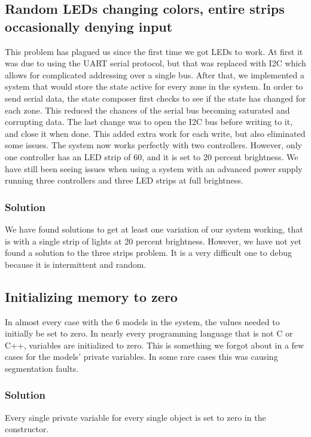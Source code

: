 \documentclass[onecolumn, draftclsnofoot,10pt, compsoc]{IEEEtran}
\begin{document}
		\subsection{Random LEDs changing colors, entire strips occasionally denying input}
			This problem has plagued us since the first time we got LEDs to work.
			At first it was due to using the UART serial protocol, but that was replaced with I2C which allows for complicated addressing over a single bus.
			After that, we implemented a system that would store the state active for every zone in the system.
			In order to send serial data, the state composer first checks to see if the state has changed for each zone.
			This reduced the chances of the serial bus becoming saturated and corrupting data.
			The last change was to open the I2C bus before writing to it, and close it when done. This added extra work for each write, but also eliminated some issues.
			The system now works perfectly with two controllers. However, only one controller has an LED strip of 60, and it is set to 20 percent brightness.
			We have still been seeing issues when using a system with an advanced power supply running three controllers and three LED strips at full brightness.
			
			\subsubsection{Solution}
				We have found solutions to get at least one variation of our system working, that is with a single strip of lights at 20 percent brightness.
				However, we have not yet found a solution to the three strips problem. It is a very difficult one to debug because it is intermittent and random.
		
		\subsection{Initializing memory to zero}
			In almost every case with the 6 models in the system, the values needed to initially be set to zero.
			In nearly every programming language that is not C or C++, variables are initialized to zero.
			This is something we forgot about in a few cases for the models' private variables.
			In some rare cases this was causing segmentation faults.
			
			\subsubsection{Solution}
				Every single private variable for every single object is set to zero in the constructor.
\end{document}
